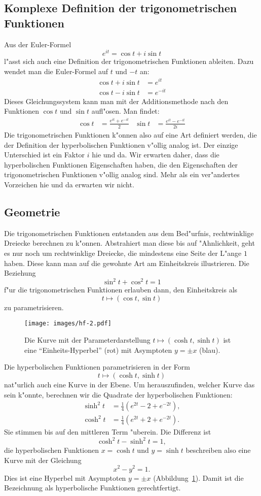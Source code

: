 \subsection{Komplexe Definition der trigonometrischen Funktionen}
Aus der Euler-Formel
\[
e^{it}=\cos t+i\sin t
\]
l"asst sich auch eine Definition der trigonometrischen Funktionen
ableiten. Dazu wendet man die Euler-Formel auf $t$ und $-t$ an:
\begin{align*}
\cos t+i\sin t&=e^{it}\\
\cos t-i\sin t&=e^{-it}
\end{align*}
Dieses Gleichungssystem kann man mit der Additionsmethode nach den
Funktionen $\cos t$ und $\sin t$ aufl"osen. Man findet:
\begin{align*}
\cos t
&=
\frac{e^{it}+e^{-it}}2
&
\sin t
&=
\frac{e^{it}-e^{-it}}{2i}
\end{align*}
Die trigonometrischen Funktionen k"onnen also auf eine Art definiert werden,
die der Definition der hyperbolischen Funktionen v"ollig analog ist.
Der einzige Unterschied ist ein Faktor $i$ hie und da.
Wir erwarten daher, dass die hyperbolischen Funktionen Eigenschaften
haben, die den Eigenschaften der trigonometrischen Funktionen v"ollig
analog sind.
Mehr als ein ver"andertes Vorzeichen hie und da erwarten wir nicht.


\subsection{Geometrie}
Die trigonometrischen Funktionen entstanden aus dem Bed"urfnis, 
rechtwinklige Dreiecke berechnen zu k"onnen.
Abstrahiert man diese bis auf "Ahnlichkeit, geht es nur noch um rechtwinklige
Dreiecke, die mindestens eine Seite der L"ange $1$ haben.
Diese kann man auf die gewohnte Art am Einheitskreis illustrieren.
Die Beziehung 
\[
\sin^2t+\cos^2t=1
\]
f"ur die trigonometrischen Funktionen erlauben dann, den Einheitskreis als
\[
t\mapsto (\cos t,\sin t)
\]
zu parametrisieren.

\begin{figure}
\centering
\texttt{[image: images/hf-2.pdf]}
\caption{Die Kurve mit der Parameterdarstellung
$t\mapsto (\cosh t, \sinh t)$ ist eine ``Einheits-Hyperbel'' (rot) mit 
Asymptoten $y=\pm x$ (blau).
\label{anhang:hyperbel}}
\end{figure}
Die hyperbolischen Funktionen parametrisieren in der Form
\[
t\mapsto (\cosh t, \sinh t)
\]
nat"urlich auch eine Kurve in der Ebene.
Um herauszufinden, welcher Kurve das sein k"onnte, berechnen wir die 
Quadrate der hyperbolischen Funktionen:
\begin{align}
\sinh^2 t&=\frac14(e^{2t}-2+e^{-2t}),
\\
\cosh^2 t&=\frac14(e^{2t}+2+e^{-2t}).
\label{hyp:definition}
\end{align}
Sie stimmen bis auf den mittleren Term "uberein.
Die Differenz ist 
\[
\cosh^2t - \sinh^2t=1,
\]
die hyperbolischen Funktionen $x=\cosh t$ und $y=\sinh t$
beschreiben also eine Kurve mit der Gleichung
\[
x^2-y^2=1.
\]
Dies ist eine Hyperbel mit Asymptoten $y=\pm x$
(Abbildung~\ref{anhang:hyperbel}).
Damit ist die Bezeichnung als hyperbolische Funktionen gerechtfertigt.

